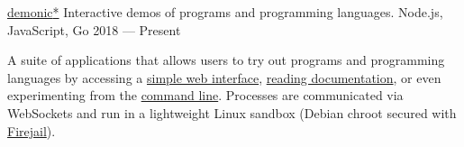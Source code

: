 \showoff
{\textcolor{my-blue}{\href{https://liambeckman.com/code/demonic}{demonic\textcolor{my-red}{*}}}}
{Interactive demos of programs and programming languages.}
{Node.js, JavaScript, Go}
{2018 --- Present}

A suite of applications that allows users to try out programs and programming languages by accessing a \textcolor{my-blue}{\href{https://liambeckman.com/code\#terminal}{simple web interface}}, \textcolor{my-blue}{\href{https://demo.liambeckman.com/docs.html}{reading documentation}}, or even experimenting from the \textcolor{my-blue}{\href{https://github.com/lbeckman314/demonic-cli.git}{command line}}. Processes are communicated via WebSockets and run in a lightweight Linux sandbox (Debian chroot secured with \textcolor{my-blue}{\href{https://firejail.wordpress.com/}{Firejail}}).

